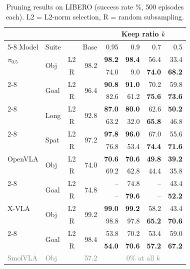 \begin{table}[t]
\centering
\caption{Pruning results on LIBERO (success rate \%, 500 episodes each). L2 = L2-norm selection, R = random subsampling.}
\label{tab:main_results}
\setlength{\tabcolsep}{2.5pt}
\footnotesize
\begin{tabular}{@{}llcrrrrr@{}}
\toprule
& & & & \multicolumn{4}{c}{Keep ratio $k$} \\
\cmidrule(l){5-8}
Model & Suite & & Base & 0.95 & 0.9 & 0.7 & 0.5 \\
\midrule
$\pi_{0.5}$ & \multirow{2}{*}{Obj} & L2 & \multirow{2}{*}{98.2} & \textbf{98.2} & \textbf{98.4} & 56.4 & 33.4 \\
& & R & & 74.0 & 9.0 & \textbf{74.0} & \textbf{68.2} \\
\cmidrule(l){2-8}
& \multirow{2}{*}{Goal} & L2 & \multirow{2}{*}{96.4} & \textbf{90.8} & \textbf{91.0} & 70.2 & 59.8 \\
& & R & & 82.6 & 61.2 & \textbf{75.6} & \textbf{73.6} \\
\cmidrule(l){2-8}
& \multirow{2}{*}{Long} & L2 & \multirow{2}{*}{92.8} & \textbf{87.0} & \textbf{80.0} & 62.6 & \textbf{50.2} \\
& & R & & 63.2 & 32.0 & \textbf{65.8} & 46.8 \\
\cmidrule(l){2-8}
& \multirow{2}{*}{Spat} & L2 & \multirow{2}{*}{97.2} & \textbf{97.8} & \textbf{96.0} & 67.0 & 55.6 \\
& & R & & 76.8 & 53.4 & \textbf{74.4} & \textbf{71.6} \\
\midrule
OpenVLA & \multirow{2}{*}{Obj} & L2 & \multirow{2}{*}{74.0} & \textbf{70.6} & \textbf{70.6} & \textbf{49.8} & \textbf{39.2} \\
& & R & & 69.2 & 62.8 & 44.4 & 35.8 \\
\cmidrule(l){2-8}
& \multirow{2}{*}{Goal} & L2 & \multirow{2}{*}{74.8} & -- & 74.8 & -- & 43.4 \\
& & R & & -- & \textbf{79.6} & -- & \textbf{52.2} \\
\midrule
X-VLA & \multirow{2}{*}{Obj} & L2 & \multirow{2}{*}{99.2} & \textbf{99.0} & \textbf{99.2} & 58.2 & 43.4 \\
& & R & & 98.8 & 97.8 & \textbf{65.2} & \textbf{70.6} \\
\cmidrule(l){2-8}
& \multirow{2}{*}{Goal} & L2 & \multirow{2}{*}{98.4} & 53.8 & 70.2 & 53.4 & 59.0 \\
& & R & & \textbf{54.0} & \textbf{70.6} & \textbf{57.2} & \textbf{67.2} \\
\midrule
\textcolor{gray}{SmolVLA} & \textcolor{gray}{Obj} & & \textcolor{gray}{57.2} & \multicolumn{4}{c}{\textcolor{gray}{0\% at all $k$}} \\
\bottomrule
\end{tabular}
\end{table}
